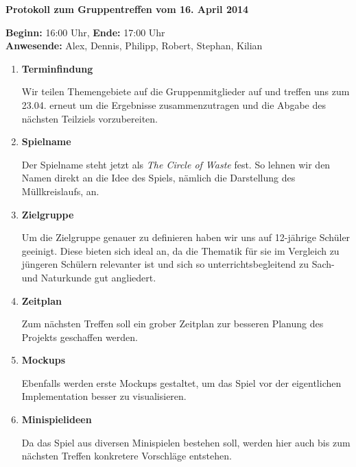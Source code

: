 \documentclass[a4paper]{article}
\newcommand{\changefont}[3]{
\fontfamily{#1} \fontseries{#2} \fontshape{#3} \selectfont}
\newcommand{\TOP}[1]{\item \textbf{#1}\par}
\begin{document}
\changefont{cmss}{m}{n} %

\begin{center}
\textbf{\Large Protokoll zum Gruppentreffen vom 16. April 2014}
\end{center}
\vspace{3mm}

\textbf{Beginn:} 16:00 Uhr, \textbf{Ende:} 17:00 Uhr\\
\textbf{Anwesende:} Alex, Dennis, Philipp, Robert, Stephan, Kilian

\vspace{5mm}

\begin{enumerate}

\TOP{Terminfindung}
Wir teilen Themengebiete auf die Gruppenmitglieder auf und treffen uns zum 23.04. erneut um die Ergebnisse zusammenzutragen und die Abgabe des nächsten Teilziels vorzubereiten.

\TOP{Spielname}
Der Spielname steht jetzt als \textit{The Circle of Waste} fest. So lehnen wir den Namen direkt an die Idee des Spiels, nämlich die Darstellung des Müllkreislaufs, an.

\TOP{Zielgruppe}
Um die Zielgruppe genauer zu definieren haben wir uns auf 12-jährige Schüler geeinigt. Diese bieten sich ideal an, da die Thematik für sie im Vergleich zu jüngeren Schülern relevanter ist und sich so unterrichtsbegleitend zu Sach- und Naturkunde gut angliedert.

\TOP{Zeitplan}
Zum nächsten Treffen soll ein grober Zeitplan zur besseren Planung des Projekts geschaffen werden.

\TOP{Mockups}
Ebenfalls werden erste Mockups gestaltet, um das Spiel vor der eigentlichen Implementation besser zu visualisieren.

\TOP{Minispielideen}
Da das Spiel aus diversen Minispielen bestehen soll, werden hier auch bis zum nächsten Treffen konkretere Vorschläge entstehen.

\end{enumerate}


\makeatletter
\def\footrule{{
  \vskip-\footruleskip\vskip-\footrulewidth
  \color{\footrulecolor}
  \hrule\@width\headwidth\@height
  \footrulewidth\vskip\footruleskip
}}
\makeatother
\renewcommand{\footrulewidth}{3pt}
\newcommand{\footrulecolor}{dgreen}
\end{document}

